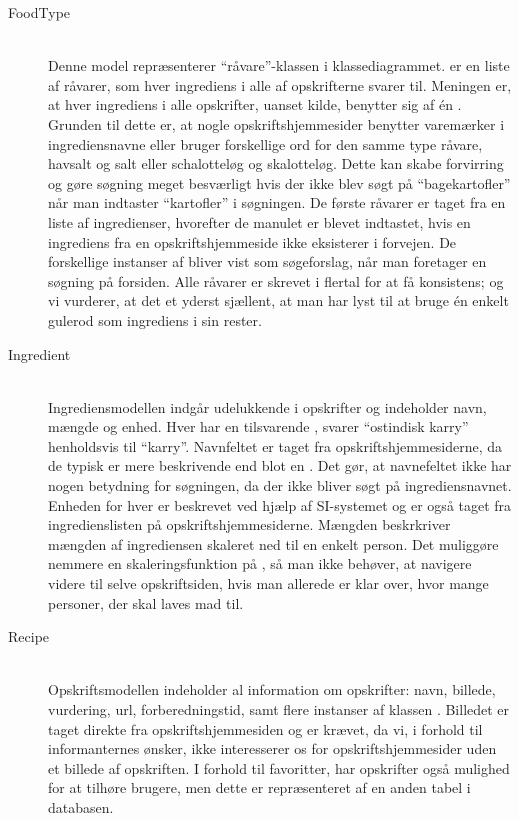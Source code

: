 \begin{description}

  \item[FoodType] \hfill \\
    Denne model repræsenterer ``råvare''-klassen i klassediagrammet.  er en liste af råvarer, som hver ingrediens i alle af opskrifterne svarer til. Meningen er, at hver ingrediens i alle opskrifter, uanset kilde, benytter sig af \'{e}n . Grunden til dette er, at nogle opskriftshjemmesider benytter varemærker i ingrediensnavne eller bruger forskellige ord for den samme type råvare, \fx havsalt og salt eller schalotteløg og skalotteløg. Dette kan skabe forvirring og gøre søgning meget besværligt hvis der ikke blev søgt på ``bagekartofler'' når man indtaster ``kartofler'' i søgningen. De første råvarer er taget fra en liste af ingredienser\cite{ingrediensliste}, hvorefter de manulet er blevet indtastet, hvis en ingrediens fra en opskriftshjemmeside ikke eksisterer i forvejen. De forskellige instanser af  bliver \fx vist som søgeforslag, når man foretager en søgning på forsiden. Alle råvarer er skrevet i flertal for at få konsistens; og vi vurderer, at det et yderst sjællent, at man har lyst til \fx at bruge \'{e}n enkelt gulerod som ingrediens i sin rester.

  \item[Ingredient] \hfill \\
    Ingrediensmodellen indgår udelukkende i opskrifter og indeholder navn, mængde og enhed. Hver  har en tilsvarende , \fx svarer ``ostindisk karry'' henholdsvis til ``karry''. Navnfeltet er taget fra opskriftshjemmesiderne, da de typisk er mere beskrivende end blot en . Det gør, at navnefeltet ikke har nogen betydning for søgningen, da der ikke bliver søgt på ingrediensnavnet. Enheden for hver  er beskrevet ved hjælp af SI-systemet og er også taget fra ingredienslisten på opskriftshjemmesiderne. Mængden beskrkriver mængden af ingrediensen skaleret ned til en enkelt person. Det muliggøre nemmere en skaleringsfunktion på \Foodl{}, så man ikke behøver, at navigere videre til selve opskriftsiden, hvis man allerede er klar over, hvor mange personer, der skal laves mad til.

  \item[Recipe] \hfill \\
    Opskriftsmodellen indeholder al information om opskrifter: navn, billede, vurdering, url, forberedningstid, samt flere instanser af klassen . Billedet er taget direkte fra opskriftshjemmesiden og er krævet, da vi, i forhold til informanternes ønsker, ikke interesserer os for opskriftshjemmesider uden et billede af opskriften. I forhold til favoritter, har opskrifter også mulighed for at tilhøre brugere, men dette er repræsenteret af en anden tabel i databasen.  


\end{description}
